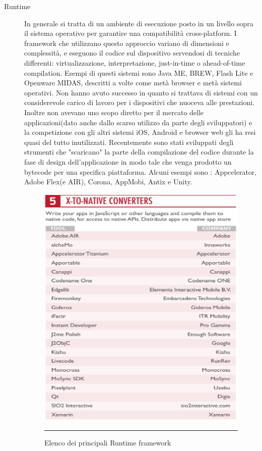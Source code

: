 \begin{description}
\item[Runtime] In generale si tratta di un ambiente di esecuzione posto in un livello sopra il sistema operativo per garantire una compatibilità cross-platform. I framework che utilizzano questo approccio variano di dimensioni e complessità, e eseguono il codice sul dispositivo servendosi di tecniche differenti: virtualizzazione, interpretazione, just-in-time o ahead-of-time compilation. Esempi di questi sistemi sono Java ME, BREW, Flash Lite e Openware MIDAS, descritti a volte come metà browser e metà sistemi operativi.
Non hanno avuto successo in quanto si trattava di sistemi con un considerevole carico di lavoro per i dispositivi che nuoceva alle prestazioni. Inoltre non avevano uno scopo diretto per il mercato delle applicazioni(dato anche dallo scarso utilizzo da parte degli sviluppatori) e la competizione con gli altri sistemi iOS, Android e browser web gli ha resi quasi del tutto inutilizzati.
Recentemente sono stati sviluppati degli strumenti che "scaricano" la parte della compilazione del codice durante la fase di design dell'applicazione in modo tale che venga prodotto un bytecode per una specifica piattaforma. Alcuni esempi sono : Appcelerator, Adobe Flex(e AIR), Corona, AppMobi, Antix e Unity.

\begin{figure}[htbp]
  \centering
   		\includegraphics[scale=0.75]{Figures/x-to-native-converters.png} 
    \rule{35em}{0.5pt}
  \caption{Elenco dei principali Runtime framework}
  \label{fig:runtime_framework}
\end{figure}


\end{description}
